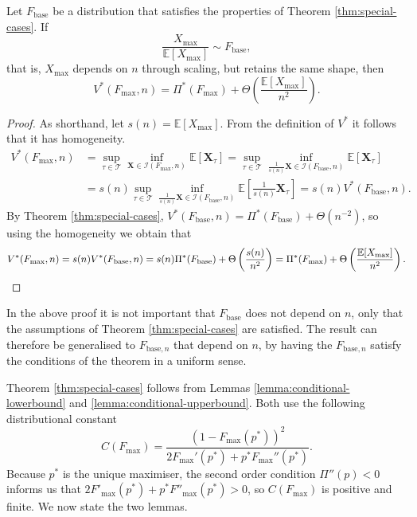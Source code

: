 \documentclass[11pt,a4paper]{article}
\numberwithin{equation}{section}
\begin{document}
\begin{corollary}
    \label{corol:scaling}
    Let $F_{\mathrm{base}}$ be a distribution that satisfies the properties of Theorem \ref{thm:special-cases}.
    If
    $$
    \frac{X_{\max}}{\mathbb{E}[X_{\max}]}\sim F_{\mathrm{base}},
    $$
    that is, $X_{\max}$ depends on $n$ through scaling, but retains the same shape, then
    $$
    V^*(F_{\max},n)=\Pi^*(F_{\max})+\Theta\left(\frac{\mathbb{E}[X_{\max}]}{n^2}\right).
    $$
\end{corollary}
\begin{proof}
    As shorthand, let $s(n)=\mathbb{E}[X_{\max}]$.
    From the definition of $V^*$ it follows that it has homogeneity.
    \begin{align*}
        V^*(F_{\max}, n)&=\sup_{\tau\in\mathcal{T}}\inf_{\boldsymbol{X}\in\mathcal{I}(F_{\max}, n)}\mathbb{E}[\boldsymbol{X}_{\tau}]
        =\sup_{\tau\in\mathcal{T}}\inf_{\frac{1}{s(n)}\boldsymbol{X}\in\mathcal{I}(F_{\mathrm{base}}, n)}\mathbb{E}[\boldsymbol{X}_{\tau}]\\
        &=s(n)\sup_{\tau\in\mathcal{T}}\inf_{\frac{1}{s(n)}\boldsymbol{X}\in\mathcal{I}(F_{\mathrm{base}}, n)}\mathbb{E}\left[\frac{1}{s(n)}\boldsymbol{X}_{\tau}\right]
        =s(n)V^*(F_{\mathrm{base}},n).
    \end{align*}
    By Theorem \ref{thm:special-cases}, $V^*(F_{\mathrm{base}},n)=\Pi^*(F_{\mathrm{base}})+\Theta(n^{-2})$, so using the homogeneity we obtain that 
    $$V^*(F_{\max},n)=s(n)V^*(F_{\mathrm{base}},n)=s(n)\Pi^*(F_{\mathrm{base}})+\Theta\left(\frac{s(n)}{n^2}\right)=\Pi^*(F_{\max})+\Theta\left(\frac{\mathbb{E}[X_{\max}]}{n^2}\right).\qedhere$$
\end{proof}
In the above proof it is not important that $F_{\mathrm{base}}$ does not depend on $n$, only that the assumptions of Theorem \ref{thm:special-cases} are satisfied.
The result can therefore be generalised to $F_{\mathrm{base},n}$ that depend on $n$, by having the $F_{\mathrm{base},n}$ satisfy the conditions of the theorem in a uniform sense.\footnotemark
{}

Theorem \ref{thm:special-cases} follows from Lemmas \ref{lemma:conditional-lowerbound} and \ref{lemma:conditional-upperbound}.
Both use the following distributional constant
$$
    C(F_{\max})=\frac{(1-F_{\max}(p^*))^{2}}{2F_{\max}'(p^*)+p^*F_{\max}''(p^*)}.
$$
\noindent Because $p^*$ is the unique maximiser, the second order condition $\Pi''(p) < 0$ informs us that $2F'_{\max}(p^*)+p^*F''_{\max}(p^*)>0$, so $C(F_{\max})$ is positive and finite. We now state the two lemmas.
\end{document}
